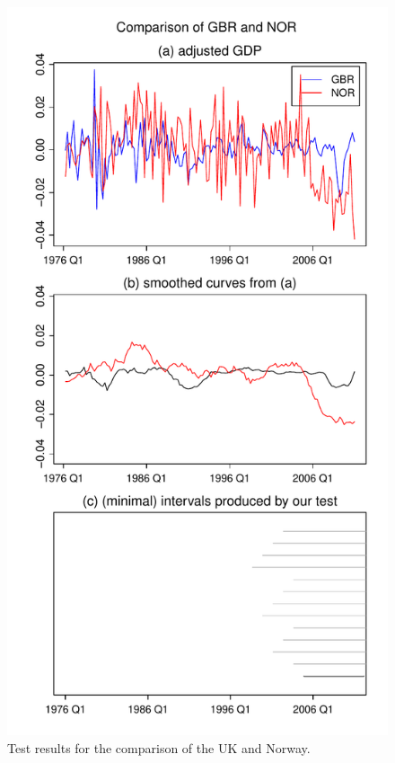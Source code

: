 \documentclass[a4paper,12pt]{article}
\begin{document}
{\begin{figure}[p!]
\begin{minipage}[t]{0.49\textwidth}
\includegraphics[width=\textwidth]{plots/GBR_vs_NOR}
\caption{Test results for the comparison of the UK and Norway.}\label{fig:UK:Norway}
\end{minipage}
\hspace{0.25cm}

\end{figure}}
\end{document}
